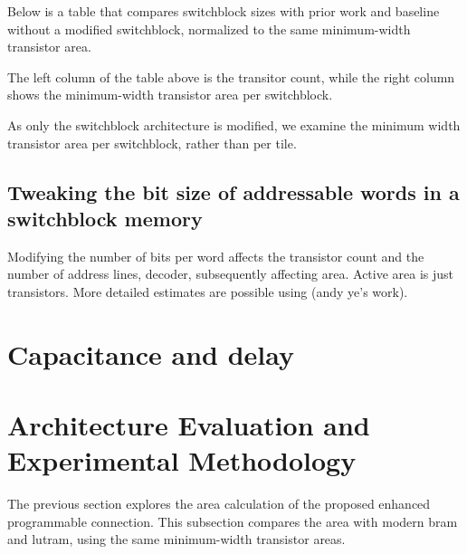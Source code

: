 Below is a table that compares switchblock sizes with prior work and baseline without a modified switchblock, normalized to the same minimum-width transistor area.




The left column of the table above is the transitor count, while the right column shows the minimum-width transistor area per switchblock. 


As only the switchblock architecture is modified, we examine the minimum width transistor area per switchblock, rather than per tile.

\subsection{Tweaking the bit size of addressable words in a switchblock memory}

Modifying the number of bits per word affects the transistor count and the number of address lines, decoder, subsequently affecting area. 
Active area is just transistors. More detailed estimates are possible using (andy ye's work).

\section{Capacitance and delay}
\label{res:delay}
\section{Architecture Evaluation and Experimental Methodology}
The previous section explores the area calculation of the proposed enhanced programmable connection. This subsection compares the area with modern bram and lutram, using the same minimum-width transistor areas.


